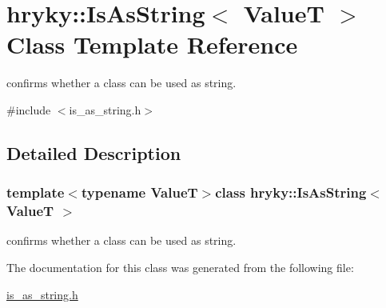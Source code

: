 \hypertarget{classhryky_1_1_is_as_string}{\section{hryky\-:\-:Is\-As\-String$<$ Value\-T $>$ Class Template Reference}
\label{classhryky_1_1_is_as_string}
}


confirms whether a class can be used as string.  




{\ttfamily \#include $<$is\-\_\-as\-\_\-string.\-h$>$}



\subsection{Detailed Description}
\subsubsection*{template$<$typename Value\-T$>$class hryky\-::\-Is\-As\-String$<$ Value\-T $>$}

confirms whether a class can be used as string. 

The documentation for this class was generated from the following file\-:\begin{DoxyCompactItemize}
\item 
\hyperlink{is__as__string_8h}{is\-\_\-as\-\_\-string.\-h}\end{DoxyCompactItemize}
